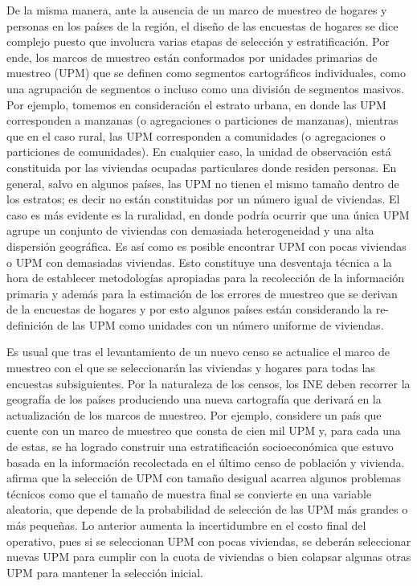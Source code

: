 \documentclass[12pt,spanish,]{book}
\begin{document}
De la misma manera, ante la ausencia de un marco de muestreo de hogares y personas en los países de la región, el diseño de las encuestas de hogares se dice complejo puesto que involucra varias etapas de selección y estratificación. Por ende, los marcos de muestreo están conformados por unidades primarias de muestreo (UPM) que se definen como segmentos cartográficos individuales, como una agrupación de segmentos o incluso como una división de segmentos masivos. Por ejemplo, tomemos en consideración el estrato urbana, en donde las UPM corresponden a manzanas (o agregaciones o particiones de manzanas), mientras que en el caso rural, las UPM corresponden a comunidades (o agregaciones o particiones de comunidades). En cualquier caso, la unidad de observación está constituida por las viviendas ocupadas particulares donde residen personas. En general, salvo en algunos países, las UPM no tienen el mismo tamaño dentro de los estratos; es decir no están constituidas por un número igual de viviendas. El caso es más evidente es la ruralidad, en donde podría ocurrir que una única UPM agrupe un conjunto de viviendas con demasiada heterogeneidad y una alta dispersión geográfica. Es así como es posible encontrar UPM con pocas viviendas o UPM con demasiadas viviendas. Esto constituye una desventaja técnica a la hora de establecer metodologías apropiadas para la recolección de la información primaria y además para la estimación de los errores de muestreo que se derivan de la encuestas de hogares y por esto algunos países están considerando la re-definición de las UPM como unidades con un número uniforme de viviendas.

Es usual que tras el levantamiento de un nuevo censo se actualice el marco de muestreo con el que se seleccionarán las viviendas y hogares para todas las encuestas subsiguientes. Por la naturaleza de los censos, los INE deben recorrer la geografía de los países produciendo una nueva cartografía que derivará en la actualización de los marcos de muestreo. Por ejemplo, considere un país que cuente con un marco de muestreo que consta de cien mil UPM y, para cada una de estas, se ha logrado construir una estratificación socioeconómica que estuvo basada en la información recolectada en el último censo de población y vivienda. \textcite[pág. 183]{Kish_1965} afirma que la selección de UPM con tamaño desigual acarrea algunos problemas técnicos como que el tamaño de muestra final se convierte en una variable aleatoria, que depende de la probabilidad de selección de las UPM más grandes o más pequeñas. Lo anterior aumenta la incertidumbre en el costo final del operativo, pues si se seleccionan UPM con pocas viviendas, se deberán seleccionar nuevas UPM para cumplir con la cuota de viviendas o bien colapsar algunas otras UPM para mantener la selección inicial.
\end{document}
